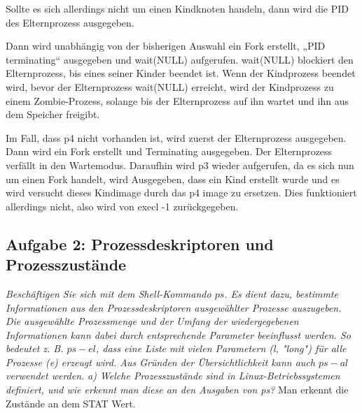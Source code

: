 \documentclass[a4paper]{article}
\begin{document}
Sollte es sich allerdings nicht um einen Kindknoten handeln, dann wird die PID des Elternprozess ausgegeben.

Dann wird unabhängig von der bisherigen Auswahl ein Fork erstellt, „PID terminating“ ausgegeben und wait(NULL) aufgerufen. wait(NULL) blockiert den Elternprozess, bis eines seiner Kinder beendet ist. Wenn der Kindprozess beendet wird, bevor der Elternprozess wait(NULL) erreicht, wird der Kindprozess zu einem Zombie-Prozess, solange bis der Elternprozess auf ihn wartet und ihn aus dem Speicher freigibt.

Im Fall, dass p4 nicht vorhanden ist, wird zuerst der Elternprozess ausgegeben. Dann wird ein Fork erstellt und Terminating ausgegeben. Der Elternprozess verfällt in den Wartemodus. Daraufhin wird p3 wieder aufgerufen, da es sich nun um einen Fork handelt, wird Ausgegeben, dass ein Kind erstellt wurde und es wird versucht dieses Kindimage durch das p4 image zu ersetzen. Dies funktioniert allerdings nicht, also wird von execl -1 zurückgegeben.



\subsection{Aufgabe 2: Prozessdeskriptoren und Prozesszustände}
\textit{Beschäftigen Sie sich mit dem Shell-Kommando $ps$. Es dient dazu, bestimmte Informationen aus den Prozessdeskriptoren ausgewählter Prozesse auszugeben. Die ausgewählte Prozessmenge und der Umfang der wiedergegebenen Informationen kann dabei durch entsprechende Parameter beeinflusst werden. So bedeutet z. B. $ps -el$, dass eine Liste mit vielen Parametern (l, "long") für alle Prozesse (e) erzeugt wird. Aus Gründen der Übersichtlichkeit kann auch $ps -al$ verwendet werden.}
\vspace{10mm}
\textit{a) Welche Prozesszustände sind in Linux-Betriebssystemen definiert, und wie erkennt man diese an den Ausgaben von ps?}
\vspace{10mm}
Man erkennt die Zustände an dem STAT Wert.
\end{document}
